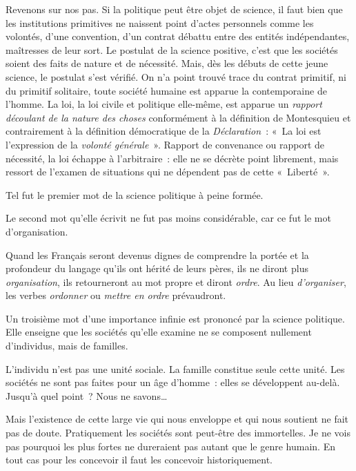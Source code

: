 \documentclass[french,twoside]{book} %
\newcommand{\astermono}{\medskip\centerline{\color{rubric}\large\selectfont{\syms ✻}}\medskip\par}%
\begin{document}
\astermono

\noindent Revenons sur nos pas. Si la politique peut être objet de science, il faut bien que les institutions primitives ne naissent point d’actes personnels comme les volontés, d’une convention, d’un contrat débattu entre des entités indépendantes, maîtresses de leur sort. Le postulat de la science positive, c’est que les sociétés soient des faits de nature et de nécessité. Mais, dès les débuts de cette jeune science, le postulat s’est vérifié. On n’a point trouvé trace du contrat primitif, ni du primitif solitaire, toute société humaine est apparue la contemporaine de l’homme. La loi, la loi civile et politique elle-même, est apparue un \emph{rapport découlant de la nature des choses} conformément à la définition de Montesquieu et contrairement à la définition démocratique de la \emph{Déclaration} : « La loi est l’expression de la \emph{volonté générale} ». Rapport de convenance ou rapport de nécessité, la loi échappe à l’arbitraire : elle ne se décrète point librement, mais ressort de l’examen de situations qui ne dépendent pas de cette « Liberté ».\par
Tel fut le premier mot de la science politique à peine formée.\par
Le second mot qu’elle écrivit ne fut pas moins considérable, car ce fut le mot d’organisation.\par
Quand les Français seront devenus dignes de comprendre la portée et la profondeur du langage qu’ils ont hérité de leurs pères, ils ne diront plus \emph{organisation}, ils retourneront au mot propre et diront \emph{ordre}. Au lieu \emph{d’organiser}, les verbes \emph{ordonner} ou \emph{mettre en ordre} prévaudront.\par

\astermono

\noindent Un troisième mot d’une importance infinie est prononcé par la science politique. Elle enseigne que les sociétés qu’elle examine ne se composent nullement d’individus, mais de familles.\par
L’individu n’est pas une unité sociale. La famille constitue seule cette unité. Les sociétés ne sont pas faites pour un âge d’homme : elles se développent au-delà. Jusqu’à quel point ? Nous ne savons…\par
Mais l’existence de cette large vie qui nous enveloppe et qui nous soutient ne fait pas de doute. Pratiquement les sociétés sont peut-être des immortelles. Je ne vois pas pourquoi les plus fortes ne dureraient pas autant que le genre humain. En tout cas pour les concevoir il faut les concevoir historiquement.\par
\end{document}
